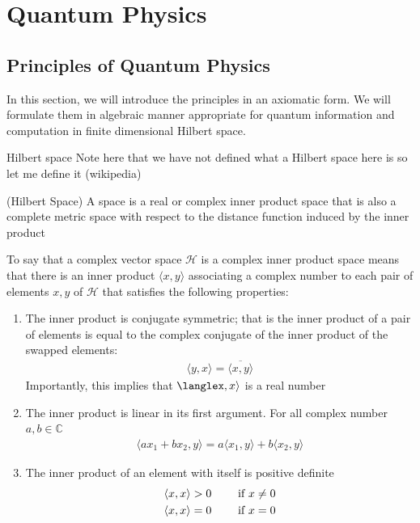 \chapter{Quantum Physics}%
\label{cha:Quantum Physics}


\section{Principles of Quantum Physics}
In this section, we will introduce the principles in an axiomatic form. We will formulate them in algebraic manner appropriate for quantum information and computation in finite dimensional Hilbert space.
\begin{parag}{Hilbert space}
Note here that we have not defined what a Hilbert space here is so let me define it (wikipedia)
\begin{definition}{(Hilbert Space)}
A  space is a real or complex inner product space that is also a complete metric space with respect to the distance function induced by the inner product
\end{definition}
To say that a complex vector space $\mathcal{H}$ is a complex inner product space means that there is an inner product $\langle x, y\rangle$ associating a complex number to each pair of elements $x, y$ of $\mathcal{H}$ that satisfies the following properties:
\begin{enumerate}
    \item The inner product is conjugate symmetric; that is the inner product of a pair of elements is equal to the complex conjugate of the inner product of the swapped elements:
	\begin{align*} 
		\langle y, x\rangle = \overline{\langle x, y\rangle} 
	\end{align*}
	Importantly, this implies that $\langlex, x\rangle$ is a real number
	\item The inner product is linear in its first argument. For all complex number $a, b \in\mathbb{C}$
		\begin{align*} 
			\langle ax_1 + bx_2, y\rangle  = a\langle x_1, y\rangle + b\langle x_2, y\rangle
		\end{align*}
	\item The inner product of an element with itself is positive definite 
		\begin{align*} 
			\langle x, x\rangle &> 0 \quad \quad \text{ if } x \neq 0\\
			 \langle x, x\rangle &=  0 \quad \quad \text{ if } x = 0
		\end{align*}
\end{enumerate}


\end{parag}


